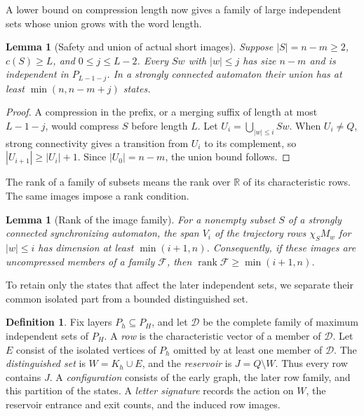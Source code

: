 \documentclass[11pt]{article}
\newtheorem{lemma}[theorem]{Lemma}
\theoremstyle{definition}
\newtheorem{definition}[theorem]{Definition}
\theoremstyle{plain}
\begin{document}
A lower bound on compression length now gives a family of large
independent sets whose union grows with the word length.

\begin{lemma}[Safety and union of actual short images]\label{lem:short-images}
Suppose $|S|=n-m\ge2$, $c(S)\ge L$, and $0\le j\le L-2$.
Every $Sw$ with $|w|\le j$ has size $n-m$ and is independent in $P_{L-1-j}$.
In a strongly connected automaton their union has at least
$\min(n,n-m+j)$ states.
\end{lemma}
\begin{proof}
A compression in the prefix, or a merging suffix of length at most
$L-1-j$, would compress $S$ before length $L$.
Let $U_i=\bigcup_{|w|\le i}Sw$. When $U_i\ne Q$, strong connectivity
gives a transition from $U_i$ to its complement, so
$|U_{i+1}|\ge|U_i|+1$. Since $|U_0|=n-m$, the union bound follows.
\end{proof}

The rank of a family of subsets means the rank over $\mathbb R$ of
its characteristic rows. The same images impose a rank condition.

\begin{lemma}[Rank of the image family]\label{lem:image-rank}
For a nonempty subset $S$ of a strongly connected synchronizing automaton, the span $V_i$ of the
trajectory rows $\chi_SM_w$ for $|w|\le i$ has dimension at least
$\min(i+1,n)$. Consequently, if these images are uncompressed members
of a family $\mathcal F$, then $\operatorname{rank}\mathcal F\ge\min(i+1,n)$.
\end{lemma}

To retain only the states that affect the later independent sets, we
separate their common isolated part from a bounded distinguished set.

\begin{definition}\label{def:configuration}
Fix layers $P_h\subseteq P_H$, and let $\mathcal D$ be the complete family
of maximum independent sets of $P_H$. A \emph{row} is the characteristic
vector of a member of $\mathcal D$.
Let $E$ consist of the isolated vertices of $P_h$ omitted by at least one
member of $\mathcal D$. The \emph{distinguished set} is $W=K_h\cup E$,
and the \emph{reservoir} is $J=Q\setminus W$. Thus every row contains $J$.
A \emph{configuration} consists of the early graph, the later row family,
and this partition of the states. A \emph{letter signature} records the
action on $W$, the reservoir entrance and exit counts, and the induced
row images.
\end{definition}
\end{document}
